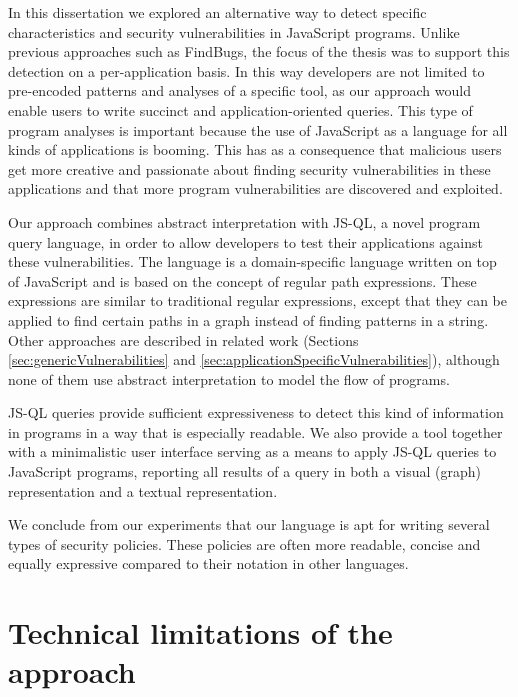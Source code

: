 In this dissertation we explored an alternative way to detect specific characteristics and security vulnerabilities in JavaScript programs. Unlike previous approaches such as FindBugs\cite{Findbugs}, the focus of the thesis was to support this detection on a per-application basis. In this way developers are not limited to pre-encoded patterns and analyses of a specific tool, as our approach would enable users to write succinct and application-oriented queries. This type of program analyses is important because the use of JavaScript as a language for all kinds of applications is booming. This has as a consequence that malicious users get more creative and passionate about finding security vulnerabilities in these applications and that more program vulnerabilities are discovered and exploited. 

Our approach combines abstract interpretation with JS-QL, a novel program query language, in order to allow developers to test their applications against these vulnerabilities. The language is a domain-specific language written on top of JavaScript and is based on the concept of regular path expressions. These expressions are similar to traditional regular expressions, except that they can be applied to find certain paths in a graph instead of finding patterns in a string. Other approaches are described in related work (Sections \ref{sec:genericVulnerabilities} and \ref{sec:applicationSpecificVulnerabilities}), although none of them use abstract interpretation to model the flow of programs.

 JS-QL queries provide sufficient expressiveness to detect this kind of information in programs in a way that is especially readable. We also provide a tool together with a minimalistic user interface serving as a means to apply JS-QL queries to JavaScript programs, reporting all results of a query in both a visual (graph) representation and a textual representation. 

 We conclude from our experiments that our language is apt for writing several types of security policies. These policies are often more readable, concise and equally expressive compared to their notation in other languages. 

\section{Technical limitations of the approach}

